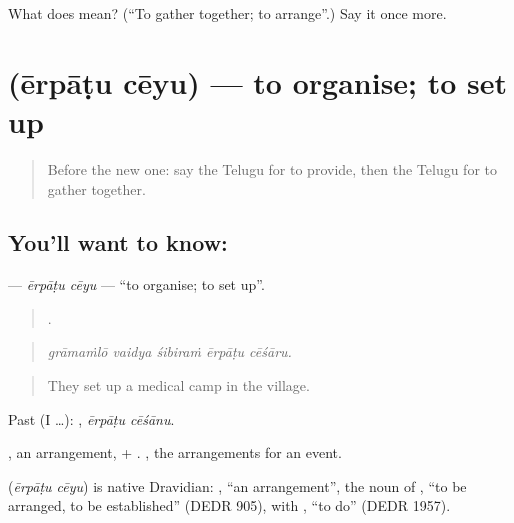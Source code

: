 \begin{tcolorbox}[breakable,colback=teal!4,colframe=teal!35!black,title={Before you move on}]
What does  mean? (\textquotedblleft{}To gather together; to arrange\textquotedblright{}.) Say it once more.
\end{tcolorbox}
\section[\texorpdfstring{\te{ఏర్పాటు} \te{చేయు} (ērpāṭu cēyu)}{ఏర్పాటు చేయు (ērpāṭu cēyu)}]{  (ērpāṭu cēyu) — to organise; to set up}

\label{lesson:TE-C464-erpatu-ceyu}



\begin{quote}
Before the new one: say the Telugu for to provide, then the Telugu for to gather together.
\end{quote}

\subsection*{You'll want to know:  }
\textbf{ } — \emph{ērpāṭu cēyu} — \textquotedblleft{}to organise; to set up\textquotedblright{}.

\begin{quote}
    .
\end{quote}

\begin{quote}
\emph{grāmaṁlō vaidya śibiraṁ ērpāṭu cēśāru.}
\end{quote}

\begin{quote}
They set up a medical camp in the village.
\end{quote}

Past (I …):  , \emph{ērpāṭu cēśānu}.

, an arrangement, + . , the arrangements for an event.

\begin{cousinweb}
\textbf{ } (\emph{ērpāṭu cēyu}) is native Dravidian: , \textquotedblleft{}an arrangement\textquotedblright{}, the noun of , \textquotedblleft{}to be arranged, to be established\textquotedblright{} (DEDR 905), with , \textquotedblleft{}to do\textquotedblright{} (DEDR 1957).
\end{cousinweb}

